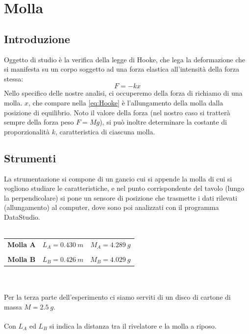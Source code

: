 
\chapter{Molla}

\section{Introduzione}
Oggetto di studio è la verifica della legge di Hooke, che lega la deformazione che si manifesta su un corpo soggetto ad una forza elastica all'intensità della forza stessa:
\begin{equation}\label{eq:Hooke}
F=-kx
\end{equation}
Nello specifico delle nostre analisi, ci occuperemo della forza di richiamo di una molla. $x$, che compare nella \ref{eq:Hooke} è l'allungamento della molla dalla posizione di equilibrio.
Noto il valore della forza (nel nostro caso si tratterà sempre della forza peso $F=Mg$), si può inoltre determinare la costante di proporzionalità $k$, caratteristica di ciascuna molla.

\section{Strumenti}
La strumentazione si compone di un gancio cui si appende la molla di cui si vogliono studiare le caratteristiche, e nel punto corrispondente del tavolo (lungo la perpendicolare) si pone un sensore di posizione che trasmette i dati rilevati (allungamento) al computer, dove sono poi analizzati con il programma DataStudio.\\
\\
\begin{tabular}{c c c}
\textbf{Molla A} & \hspace{1.5cm} $L_A=0.430\ m$ & \hspace{1.5cm} $M_A=4.289\ g$\\
\\
\textbf{Molla B} & \hspace{1.5cm} $L_B=0.426\ m$ & \hspace{1.5cm} $M_B=4.029\ g$\\
\end{tabular}
\\
\\
Per la terza parte dell'esperimento ci siamo serviti di un disco di cartone di massa $M=2.5\ g$. 
\\
\\
Con $L_A$ ed $L_B$ si indica la distanza tra il rivelatore e la molla a riposo. 

